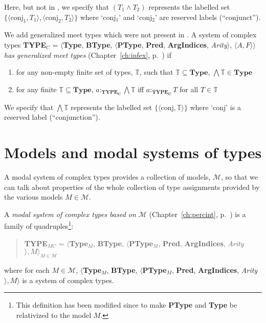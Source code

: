 Here, but not in \cite{Cooper2012}, we specify that $(T_1\wedge T_2)$
represents the labelled set
$\{\langle\mathrm{conj}_1,T_1\rangle,\langle\mathrm{conj_2},T_2\rangle\}$
where `conj$_1$' and `conj$_2$' are reserved labels (``conjunct'').

We add generalized meet types which were not present in
\cite{Cooper2012}.  A system of complex types {\bf TYPE$_C$} = $\langle${\bf Type}, {\bf BType},
$\langle$\textbf{PType}, {\bf Pred}, \textbf{ArgIndices}, {\it
  Arity\/}$\rangle$, $\langle A,F\rangle$$\rangle$ \textit{has
  generalized meet
  types} (Chapter~\ref{ch:infex}, p.~\pageref{ex:genmeettypes}) if 

\begin{enumerate} 
 
\item for any non-empty finite set of types, $\mathbb{T}$, such that $\mathbb{T}
  \subseteq\mathbf{Type}$, $\bigwedge\mathbb{T} \in \mathbf{Type}$ 
 
\item for any finite $\mathbb{T} \subseteq\mathbf{Type}$, $a:_{\mathbf{TYPE_C}}\bigwedge\mathbb{T}$ iff
  $a:_{\mathbf{TYPE_C}}T$ for all $T\in\mathbb{T}$
 
\end{enumerate}

We specify that $\bigwedge\mathbb{T}$
represents the labelled set
$\{\langle\mathrm{conj},\mathbb{T}\rangle\}$
where `conj' is a reserved label (``conjunction'').


\section{Models and modal systems of types}
\label{app:modal}



A modal system of complex types
provides a collection of models, $\mathcal{M}$, so that we can talk about properties of the whole collection of
type assignments provided by the various models $M\in\mathcal{M}$.

A \textit{modal system of complex types based on $\mathcal{M}$}
(Chapter~\ref{ch:percint}, p.~\pageref{ex:modalsys-complex}) is a
family of quadruples\footnote{This definition has been modified since
  \cite{Cooper2012} to make \textbf{PType} and \textbf{Type} be
  relativized to the model $M$.}:
\begin{quote}
{\bf TYPE$_{\mathit{MC}}$} = $\langle${\bf Type}$_M$, {\bf BType},
$\langle$\textbf{PType}$_M$, {\bf Pred}, \textbf{ArgIndices}, {\it Arity\/}$\rangle, M\rangle_{M\in\mathcal{M}}$
\end{quote}
where for each $M\in \mathcal{M}$, $\langle${\bf Type}$_M$, {\bf BType},
$\langle$\textbf{PType}$_M$, {\bf Pred}, \textbf{ArgIndices}, {\it Arity\/}$\rangle, M\rangle$ is
a system of complex types.

